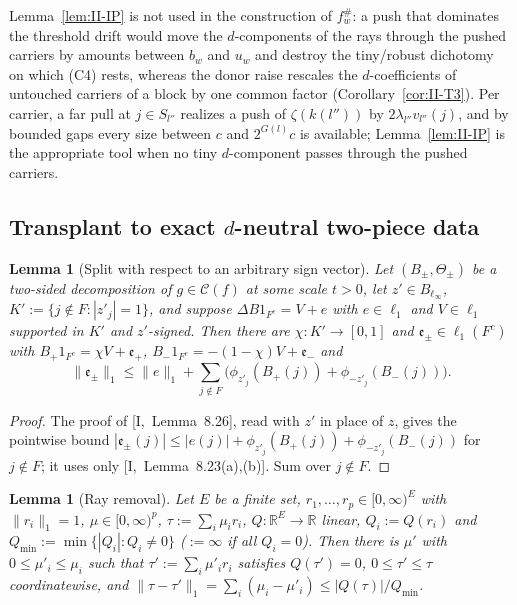 \documentclass[10pt]{amsart}
\newtheorem{lemma}[theorem]{Lemma}
\theoremstyle{definition}
\theoremstyle{remark}
\newcommand{\R}{\mathbb R}
\newcommand{\Cset}{\mathcal C}
\begin{document}
Lemma~\ref{lem:II-IP} is not used in the construction of $f^\#_w$: a push
that dominates the threshold drift would move the $d$-components of the
rays through the pushed carriers by amounts between $b_w$ and $u_w$ and
destroy the tiny/robust dichotomy on which (C4) rests, whereas the donor
raise rescales the $d$-coefficients of untouched carriers of a block by one
common factor (Corollary~\ref{cor:II-T3}).  Per carrier, a far pull at
$j\in S_{l''}$ realizes a push of $\zeta(k(l''))$ by
$2\lambda_{l''}v_{l''}(j)$, and by bounded gaps every size between $c$ and
$2^{G(l)}c$ is available; Lemma~\ref{lem:II-IP} is the appropriate tool when
no tiny $d$-component passes through the pushed carriers.

\subsection{Transplant to exact $d$-neutral two-piece data}
\label{subsec:II-transplant}

\begin{lemma}[Split with respect to an arbitrary sign vector]
\label{lem:II-splitz}
Let $(B_\pm,\Theta_\pm)$ be a two-sided decomposition of $g\in\Cset(f)$ at
some scale $t>0$, let $z'\in B_{\ell_\infty}$, $K':=\{j\notin F:|z'_j|=1\}$,
and suppose $\Delta B1_{F^c}=V+e$ with $e\in\ell_1$ and $V\in\ell_1$
supported in $K'$ and $z'$-signed.  Then there are $\chi:K'\to[0,1]$ and
$\mathfrak e_\pm\in\ell_1(F^c)$ with $B_+1_{F^c}=\chi V+\mathfrak e_+$,
$B_-1_{F^c}=-(1-\chi)V+\mathfrak e_-$ and
\[
 \|\mathfrak e_\pm\|_1\le\|e\|_1+\sum_{j\notin F}\big(\phi_{z'_j}(B_+(j))+
 \phi_{-z'_j}(B_-(j))\big).
\]
\end{lemma}

\begin{proof}
The proof of [I,~Lemma~8.26], read with $z'$ in place of $z$, gives the
pointwise bound $|\mathfrak e_\pm(j)|\le|e(j)|+\phi_{z'_j}(B_+(j))+
\phi_{-z'_j}(B_-(j))$ for $j\notin F$; it uses only
[I,~Lemma~8.23(a),(b)].  Sum over $j\notin F$.
\end{proof}

\begin{lemma}[Ray removal]\label{lem:II-rayremoval}
Let $E$ be a finite set, $r_1,\dots,r_p\in[0,\infty)^E$ with $\|r_i\|_1=1$,
$\mu\in[0,\infty)^p$, $\tau:=\sum_i\mu_ir_i$, $Q:\R^E\to\R$ linear,
$Q_i:=Q(r_i)$ and $Q_{\min}:=\min\{|Q_i|:Q_i\ne0\}$ \textup{(}$:=\infty$ if all
$Q_i=0$\textup{)}.  Then there is $\mu'$ with $0\le\mu'_i\le\mu_i$ such that
$\tau':=\sum_i\mu'_ir_i$ satisfies $Q(\tau')=0$, $0\le\tau'\le\tau$
coordinatewise, and $\|\tau-\tau'\|_1=\sum_i(\mu_i-\mu'_i)\le|Q(\tau)|/
Q_{\min}$.
\end{lemma}
\end{document}
